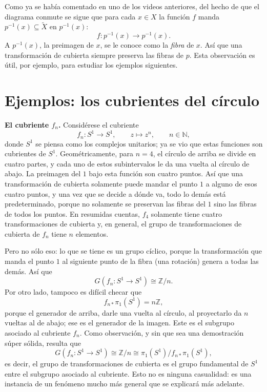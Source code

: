 \documentclass[11pt]{article}
\begin{document}
Como ya se había comentado en uno de los videos anteriores, del hecho de que el diagrama conmute se sigue que para cada $x\in X$ la función $f$ manda $p^{-1}(x)\subseteq\tilde X$ en $p^{-1}(x)$:
\[
  f\colon p^{-1}(x)\to p^{-1}(x).
\]
A $p^{-1}(x)$, la preimagen de $x$, se le conoce como la \emph{fibra} de $x$. Así que una transformación de cubierta siempre preserva las fibras de $p$. Esta observación es útil, por ejemplo, para estudiar los ejemplos siguientes.

\section*{Ejemplos: los cubrientes del círculo}

\medskip\noindent\textbf{El cubriente $f_n$.} Considérese el cubriente
\[
  f_n\colon S^1\to S^1,\qquad z\longmapsto z^n,\qquad n\in\mathbb N,
\]
donde $S^1$ se piensa como los complejos unitarios; ya se vio que estas funciones son cubrientes de $S^1$. Geométricamente, para $n=4$, el círculo de arriba se divide en cuatro partes, y cada uno de estos subintervalos le da una vuelta al círculo de abajo. La preimagen del $1$ bajo esta función son cuatro puntos. Así que una transformación de cubierta solamente puede mandar el punto $1$ a alguno de esos cuatro puntos, y una vez que se decide a dónde va, todo lo demás está predeterminado, porque no solamente se preservan las fibras del $1$ sino las fibras de todos los puntos. En resumidas cuentas, $f_4$ solamente tiene cuatro transformaciones de cubierta y, en general, el grupo de transformaciones de cubierta de $f_n$ tiene $n$ elementos.

Pero no sólo eso: lo que se tiene es un grupo cíclico, porque la transformación que manda el punto $1$ al siguiente punto de la fibra (una rotación) genera a todas las demás. Así que
\[
  G(f_n\colon S^1\to S^1)\cong\mathbb Z/n .
\]
Por otro lado, tampoco es difícil checar que
\[
  f_{n*}\pi_1(S^1)=n\mathbb Z ,
\]
porque el generador de arriba, darle una vuelta al círculo, al proyectarlo da $n$ vueltas al de abajo; ese es el generador de la imagen. Este es el subgrupo asociado al cubriente $f_n$. Como observación, y sin que sea una demostración súper sólida, resulta que
\[
  G(f_n\colon S^1\to S^1)\cong\mathbb Z/n\cong\pi_1(S^1)/f_{n*}\pi_1(S^1),
\]
es decir, el grupo de transformaciones de cubierta es el grupo fundamental de $S^1$ entre el subgrupo asociado al cubriente. Esto no es ninguna casualidad: es una instancia de un fenómeno mucho más general que se explicará más adelante.
\end{document}

